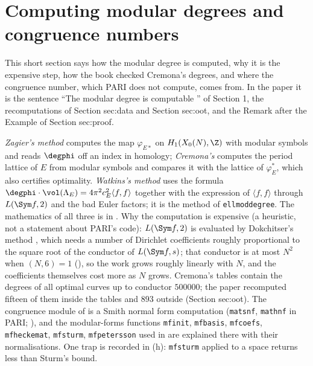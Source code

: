 \begin{sloppypar}
\section{Computing modular degrees and congruence numbers}\label{sec:computation:moddeg}

This short section says how the modular degree is computed, why it is the expensive step, how the book checked Cremona's degrees, and where
the congruence number, which PARI does not compute, comes from. In the paper it is the sentence ``The modular degree is computable
\cite{Cremona97,Watkins02}'' of Section 1, the recomputations of Section sec:data and Section sec:oot, and the Remark after the Example of Section
sec:proof.

\begin{remark}\label{rem:computation:moddeg-methods}
\emph{Zagier's method} \cite{Zagier85} computes the map $\varphi_{E*}$ on $H_1(X_0(N),\Z)$ with modular symbols and reads $\degphi$ off an index in
homology; \emph{Cremona's} \cite[Chapter II]{Cremona97} computes the period lattice of $E$ from modular symbols and compares it with the lattice
of $\varphi_E^*$, which also certifies optimality. \emph{Watkins's method} \cite{Watkins02} uses the formula $\degphi\cdot\vol(\Lambda_E)=4\pi^2c_E^2\langle f,f\rangle$
together with the expression of $\langle f,f\rangle$ through $L(\Sym f,2)$ and the bad Euler factors; it is the method of \texttt{ellmoddegree}. The
mathematics of all three is in . Why the computation is expensive (a heuristic, not a statement about PARI's
code): $L(\Sym f,2)$ is evaluated by Dokchitser's method \cite{Dokchitser04}, which needs a number of Dirichlet coefficients roughly proportional
to the square root of the conductor of $L(\Sym f,s)$; that conductor is at most $N^2$ when $(N,6)=1$ (), so the work grows
roughly linearly with $N$, and the coefficients themselves cost more as $N$ grows. Cremona's tables contain the degrees of all optimal curves
up to conductor $500000$; the paper recomputed fifteen of them inside the tables and $893$ outside (Section sec:oot). The congruence module of
 is a Smith normal form computation (\texttt{matsnf}, \texttt{mathnf} in PARI; ), and the modular-forms
functions \texttt{mfinit}, \texttt{mfbasis}, \texttt{mfcoefs}, \texttt{mfheckemat}, \texttt{mfsturm}, \texttt{mfpetersson} used in 
are explained there with their normalisations. One trap is recorded in (h): \texttt{mfsturm} applied to a space returns less than Sturm's bound.
\end{remark}


\end{sloppypar}
